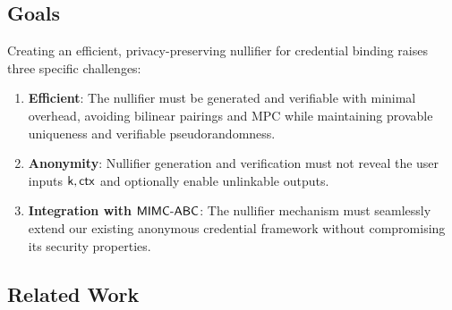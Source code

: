 \subsection{Goals}

Creating an efficient, privacy-preserving nullifier for credential binding raises three specific challenges:
\begin{enumerate}
    \item \textbf{Efficient}: The nullifier must be generated and verifiable with minimal overhead, avoiding bilinear pairings and MPC while maintaining provable uniqueness and verifiable pseudorandomness.
    
    \item \textbf{Anonymity}: Nullifier generation and verification must not reveal the user inputs $\mathsf{k}, \mathsf{ctx}$ and optionally enable unlinkable outputs. 
    
    \item \textbf{Integration with $\mathsf{MIMC\text{-}ABC}$}: The nullifier mechanism must seamlessly extend our existing anonymous credential framework without compromising its security properties.
\end{enumerate}


\subsection{Related Work}

